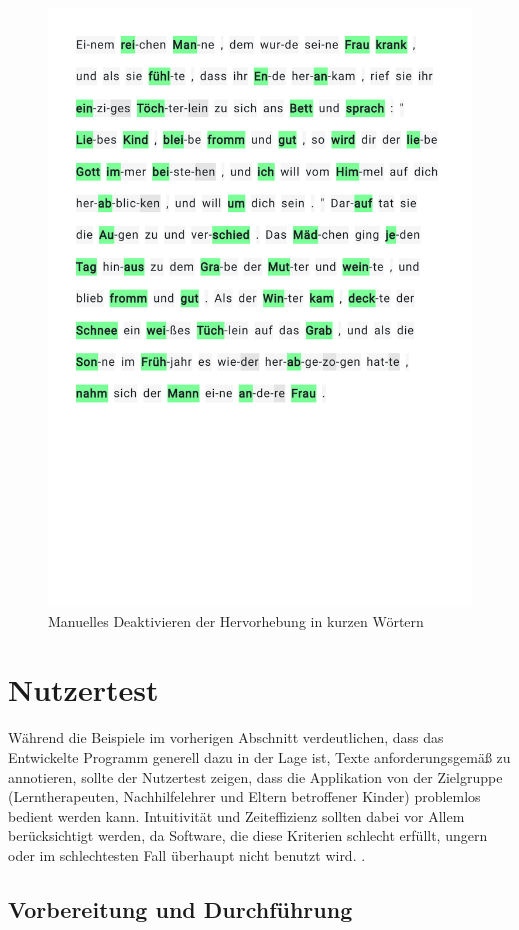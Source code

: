 \begin{figure}[h!]
	\centering
	\includegraphics[width=.7\linewidth, frame]{figures/evaluation/annotation5}
	\caption{Manuelles Deaktivieren der Hervorhebung in kurzen Wörtern}
	\label{fig:evaluation-ex5}
\end{figure}
\newpage

\section{Nutzertest}

Während die Beispiele im vorherigen Abschnitt verdeutlichen, dass das Entwickelte Programm generell dazu in der Lage ist, Texte anforderungsgemäß zu annotieren, sollte der Nutzertest zeigen, dass die Applikation von der Zielgruppe (Lerntherapeuten, Nachhilfelehrer und Eltern betroffener Kinder) problemlos bedient werden kann. Intuitivität und Zeiteffizienz sollten dabei vor Allem berücksichtigt werden, da Software, die diese Kriterien schlecht erfüllt, ungern oder im schlechtesten Fall überhaupt nicht benutzt wird. .

\subsection{Vorbereitung und Durchführung}

